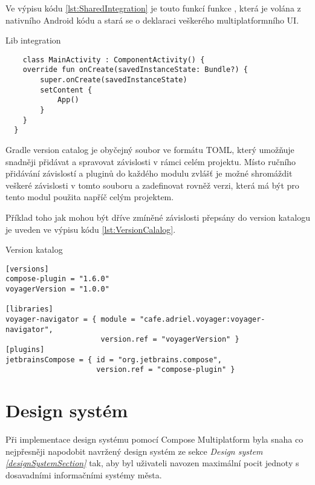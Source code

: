Ve výpisu kódu \ref{lst:SharedIntegration} je touto funkcí funkce , která je volána z nativního Android kódu a stará se
o deklaraci veškerého multiplatformního UI.
\begin{listing}[H]
  \caption{Lib integration}\label{lst:SharedIntegration}
  \begin{verbatim}
    class MainActivity : ComponentActivity() {
    override fun onCreate(savedInstanceState: Bundle?) {
        super.onCreate(savedInstanceState)
        setContent {
            App()
        }
    }
  }
\end{verbatim}
\end{listing}






Gradle version catalog je obyčejný soubor ve formátu TOML, který umožňuje snadněji přidávat a spravovat závislosti v rámci celém projektu. 
Místo ručního přidávání závislostí a pluginů do každého modulu zvlášť je možné shromáždit veškeré závislosti v tomto souboru a zadefinovat rovněž
verzi, která má být pro tento modul použita napříč celým projektem. 

Příklad toho jak mohou být dříve zmíněné závislosti přepsány do version
katalogu je uveden ve výpisu kódu \ref{lst:VersionCalalog}.

\begin{listing}[H]
\caption{Version katalog}\label{lst:VersionCalalog}
\begin{verbatim}
[versions]
compose-plugin = "1.6.0"
voyagerVersion = "1.0.0"
    
[libraries]
voyager-navigator = { module = "cafe.adriel.voyager:voyager-navigator", 
                      version.ref = "voyagerVersion" }
[plugins]
jetbrainsCompose = { id = "org.jetbrains.compose",
                     version.ref = "compose-plugin" }
\end{verbatim}
\end{listing}



\section{Design systém} \label{designSystemImpl}
Při implementace design systému pomocí Compose Multiplatform byla snaha co nejpřesněji napodobit navržený design systém ze sekce 
\textit{Design system \ref{designSystemSection}}
tak, aby byl uživateli navozen maximální pocit jednoty s dosavadními informačními systémy města.

